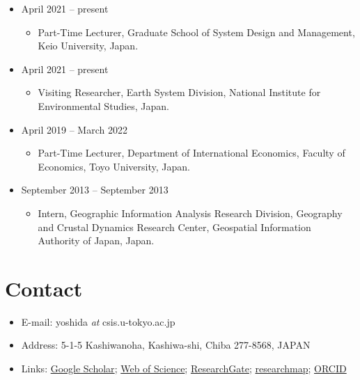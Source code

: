 \documentclass[
]{book}
\providecommand{\tightlist}{%
  \setlength{\itemsep}{0pt}\setlength{\parskip}{0pt}}
\begin{document}
\begin{itemize}
\tightlist
\item
  April 2021 -- present

  \begin{itemize}
  \tightlist
  \item
    Part-Time Lecturer,
    Graduate School of System Design and Management, Keio University, Japan.
  \end{itemize}
\item
  April 2021 -- present

  \begin{itemize}
  \tightlist
  \item
    Visiting Researcher,
    Earth System Division, National Institute for Environmental Studies, Japan.
  \end{itemize}
\item
  April 2019 -- March 2022

  \begin{itemize}
  \tightlist
  \item
    Part-Time Lecturer,
    Department of International Economics, Faculty of Economics, Toyo University, Japan.
  \end{itemize}
\item
  September 2013 -- September 2013

  \begin{itemize}
  \tightlist
  \item
    Intern,
    Geographic Information Analysis Research Division, Geography and Crustal Dynamics Research Center, Geospatial Information Authority of Japan, Japan.
  \end{itemize}
\end{itemize}

\hypertarget{contact}{%
\section*{Contact}\label{contact}}

\begin{itemize}
\tightlist
\item
  E-mail: yoshida \emph{at} csis.u-tokyo.ac.jp
\item
  Address: 5-1-5 Kashiwanoha, Kashiwa-shi, Chiba 277-8568, JAPAN
\item
  Links: \href{https://scholar.google.co.jp/citations?user=bYbQYeUAAAAJ\&hl=ja}{Google Scholar}; \href{https://www.webofscience.com/wos/author/record/847593}{Web of Science}; \href{https://www.researchgate.net/profile/Takahiro_Yoshida5}{ResearchGate}; \href{https://researchmap.jp/yoshida.takahiro}{researchmap}; \href{https://orcid.org/0000-0001-8741-5345}{ORCID}
\end{itemize}
\end{document}
